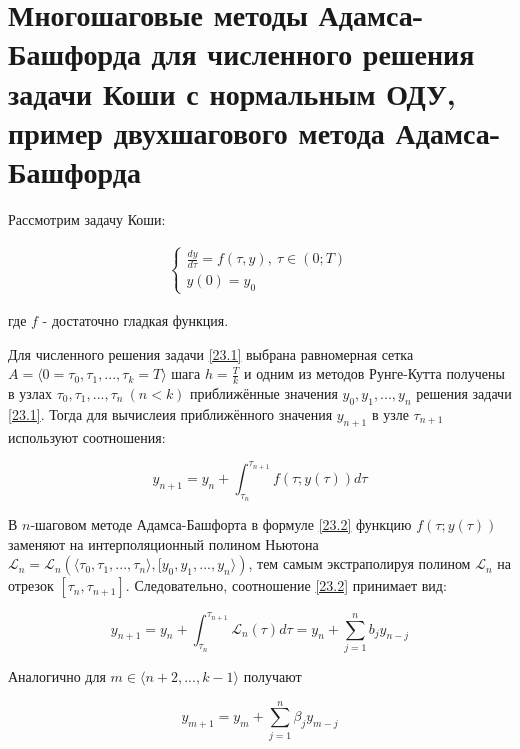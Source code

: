 \documentclass[__main__.tex]{subfiles}
\begin{document}
\section{Многошаговые методы Адамса-Башфорда для численного решения задачи Коши с нормальным ОДУ, пример двухшагового метода Адамса- Башфорда}

Рассмотрим задачу Коши:

\begin{gather}\label{23.1}
\begin{cases}
\frac{dy}{d\tau} = f \left( \tau, y \right), \ \tau \in \left( 0;T \right) \\
y\left(0\right) = y_0
\end{cases}
\end{gather}

где $f$ - достаточно гладкая функция.

Для численного решения задачи \ref{23.1} выбрана равномерная сетка $A = \langle 0 = \tau_0, \tau_1,..., \tau_k = T \rangle$ шага $h = \frac{T}{k}$ и одним из методов Рунге-Кутта получены в узлах $\tau_0, \tau_1, ..., \tau_n \ \left( n<k \right)$ приближённые значения $y_0, y_1,...,y_n$ решения задачи \ref{23.1}. Тогда для вычислеия приближённого значения $y_{n+1}$ в узле $\tau_{n+1}$ используют соотношения:

\begin{equation}\label{23.2}
y_{n+1} = y_n + \int_{\tau_n}^{\tau_{n+1}} f \left( \tau; y \left(\tau\right) \right) d\tau
\end{equation}

В $n$-шаговом методе Адамса-Башфорта в формуле \ref{23.2} функцию $f\left( \tau;y\left(\tau\right) \right)$ заменяют на интерполяционный полином Ньютона $\mathcal{L}_n = \mathcal{L}_n \left( \langle \tau_0, \tau_1,..., \tau_n \rangle, [ y_0,y_1,...,y_n \rangle \right)$, тем самым экстраполируя полином $\mathcal{L}_n$ на отрезок $ [\tau_n, \tau_{n+1}] $. Следовательно, соотношение \ref{23.2} принимает вид:

\begin{equation}\label{23.3}
y_{n+1} = y_n + \int_{\tau_n}^{\tau_{n+1}} \mathcal{L}_n \left(\tau\right)d\tau = y_n + \sum_{j=1}^{n} b_j y_{n-j}
\end{equation}

Аналогично для $m \in \langle n+2,..., k-1 \rangle$ получают

\begin{equation}\label{23.4}
y_{m+1} = y_m + \sum_{j=1}^{n} \beta_j y_{m-j}
\end{equation}
\end{document}
